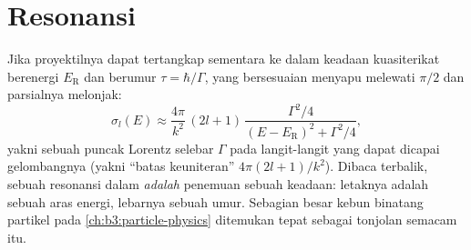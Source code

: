 \section{Resonansi}

\begin{proposition}\label{prop:b3:scattering-theory:resonance}
Jika proyektilnya dapat tertangkap sementara ke dalam keadaan
kuasiterikat berenergi $E_{\text{R}}$ dan berumur $\tau = \hbar/\Gamma$,
 yang bersesuaian menyapu melewati $\pi/2$ dan  parsialnya melonjak:
\[
\sigma_l(E) \approx \frac{4\pi}{k^2}\,(2l+1)\,
\frac{\Gamma^2/4}{(E - E_{\text{R}})^2 + \Gamma^2/4} ,
\]
yakni sebuah puncak Lorentz selebar $\Gamma$ pada langit-langit yang
dapat dicapai gelombangnya (yakni ``batas keuniteran''
$4\pi(2l+1)/k^2$). Dibaca terbalik, sebuah resonansi dalam  \emph{adalah} penemuan sebuah keadaan: letaknya adalah sebuah
aras energi, lebarnya sebuah umur. Sebagian besar kebun binatang
partikel pada \cref{ch:b3:particle-physics} ditemukan tepat sebagai
tonjolan semacam itu.
\end{proposition}
\admitted

